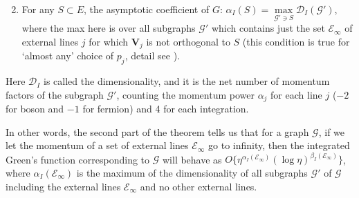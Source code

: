 \documentclass{article}
\begin{document}
\begin{enumerate}
\setcounter{enumi}{1}
    \item For any $S \subset E$, the asymptotic coefficient of $G$: $\alpha_I(S)=\max\limits_{\mathcal{G'}\ni S} \mathcal{D}_I(\mathcal{G'})$, where the max here is over all subgraphs $\mathcal{G'}$ which contains just the set $\mathcal{E}_\infty$ of external lines $j$ for which $\mathbf{V}_j$ is not orthogonal to $S$ (this condition is true for `almost any' choice of $p_j$, detail see \cite[\S V]{weinberg}). 
\end{enumerate}
Here $\mathcal{D}_I$ is called the dimensionality, and it is the net number of momentum factors of the subgraph $\mathcal{G'}$, counting the momentum power $\alpha_j$ for each line $j$ ($-2$ for boson and $-1$ for fermion) and 4 for each integration. 

In other words, the second part of the theorem tells us that for a graph $\mathcal{G}$, if we let the momentum of a set of external lines $\mathcal{E}_\infty$ go to infinity, then the integrated Green's function corresponding to $\mathcal{G}$ will behave as $O\{\eta^{\alpha_I(\mathcal{E}_\infty)}(\log \eta)^{\beta_I(\mathcal{E}_\infty)}\}$, where $\alpha_I(\mathcal{E}_\infty)$ is the maximum of the dimensionality of all subgraphs $\mathcal{G'}$ of $\mathcal{G}$ including the external lines $\mathcal{E}_\infty$ and no other external lines.
\end{document}
